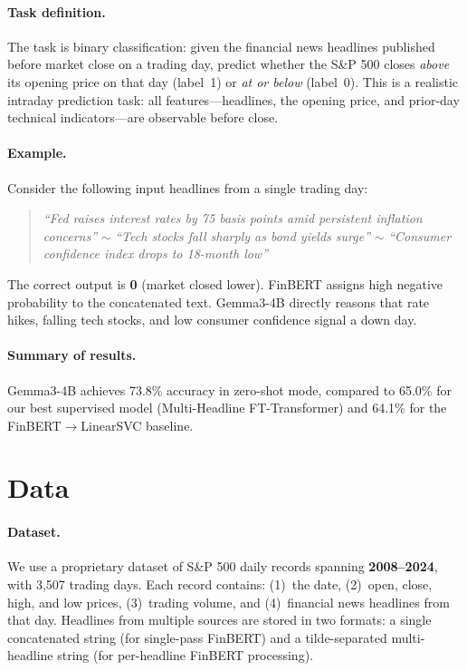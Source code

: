 \documentclass[11pt]{article}
\begin{document}
\paragraph{Task definition.} The task is binary classification: given the financial news headlines published before market close on a trading day, predict whether the S\&P 500 closes \emph{above} its opening price on that day (label~1) or \emph{at or below} (label~0). This is a realistic intraday prediction task: all features—headlines, the opening price, and prior-day technical indicators—are observable before close.

\paragraph{Example.} Consider the following input headlines from a single trading day:
\begin{quote}
\small\textit{``Fed raises interest rates by 75 basis points amid persistent inflation concerns''} $\sim$ \textit{``Tech stocks fall sharply as bond yields surge''} $\sim$ \textit{``Consumer confidence index drops to 18-month low''}
\end{quote}
The correct output is \textbf{0} (market closed lower). FinBERT assigns high negative probability to the concatenated text. Gemma3-4B directly reasons that rate hikes, falling tech stocks, and low consumer confidence signal a down day.

\paragraph{Summary of results.} Gemma3-4B achieves 73.8\% accuracy in zero-shot mode, compared to 65.0\% for our best supervised model (Multi-Headline FT-Transformer) and 64.1\% for the FinBERT$\to$LinearSVC baseline.

\section{Data}
\label{sec:data}

\paragraph{Dataset.} We use a proprietary dataset of S\&P 500 daily records spanning \textbf{2008--2024}, with 3,507 trading days. Each record contains: (1)~the date, (2)~open, close, high, and low prices, (3)~trading volume, and (4)~financial news headlines from that day. Headlines from multiple sources are stored in two formats: a single concatenated string (for single-pass FinBERT) and a tilde-separated multi-headline string (for per-headline FinBERT processing).
\end{document}
